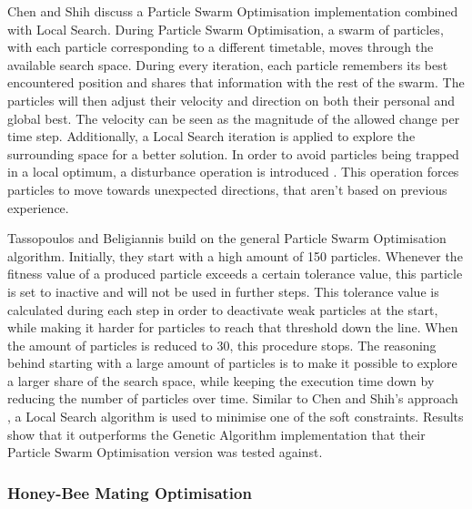 Chen and Shih \cite{Chen2013} discuss a Particle Swarm Optimisation implementation combined with Local Search. During Particle Swarm Optimisation, a swarm of particles, with each particle corresponding to a different timetable, moves through the available search space. During every iteration, each particle remembers its best encountered position and shares that information with the rest of the swarm. The particles will then adjust their velocity and direction on both their personal and global best. The velocity can be seen as the magnitude of the allowed change per time step. Additionally, a Local Search iteration is applied to explore the surrounding space for a better solution. In order to avoid particles being trapped in a local optimum, a disturbance operation is introduced \cite{tsai2010}. This operation forces particles to move towards unexpected directions, that aren't based on previous experience. 

Tassopoulos and Beligiannis \cite{Tassopoulos2012} build on the general Particle Swarm Optimisation algorithm. Initially, they start with a high amount of 150 particles. Whenever the fitness value of a produced particle exceeds a certain tolerance value, this particle is set to inactive and will not be used in further steps. This tolerance value is calculated during each step in order to deactivate weak particles at the start, while making it harder for particles to reach that threshold down the line. When the amount of particles is reduced to 30, this procedure stops. The reasoning behind starting with a large amount of particles is to make it possible to explore a larger share of the search space, while keeping the execution time down by reducing the number of particles over time. Similar to Chen and Shih's approach \cite{Chen2013}, a Local Search algorithm is used to minimise one of the soft constraints. Results show that it outperforms the Genetic Algorithm implementation that their Particle Swarm Optimisation version was tested against.

\subsubsection{Honey-Bee Mating Optimisation}

